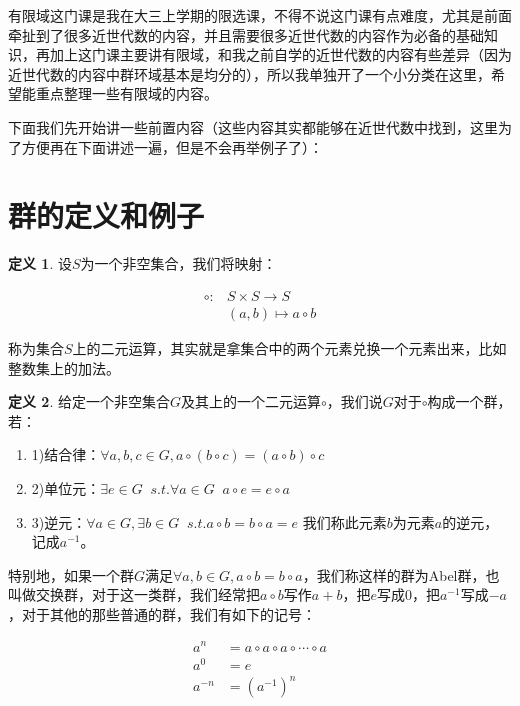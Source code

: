 \documentclass[12pt, a4paper, oneside]{ctexart}
\theoremstyle{definition}
\newtheorem*{definition}{定义}
\begin{document}
有限域这门课是我在大三上学期的限选课，不得不说这门课有点难度，尤其是前面牵扯到了很多近世代数的内容，并且需要很多近世代数的内容作为必备的基础知识，再加上这门课主要讲有限域，和我之前自学的近世代数的内容有些差异（因为近世代数的内容中群环域基本是均分的），所以我单独开了一个小分类在这里，希望能重点整理一些有限域的内容。

下面我们先开始讲一些前置内容（这些内容其实都能够在近世代数中找到，这里为了方便再在下面讲述一遍，但是不会再举例子了）：

\section*{群的定义和例子}

\begin{definition}
设$S$为一个非空集合，我们将映射：

\begin{align*}
\circ :& S\times S\rightarrow S\\
&(a,b)\mapsto a\circ b
\end{align*}

称为集合$S$上的二元运算，其实就是拿集合中的两个元素兑换一个元素出来，比如整数集上的加法。
\end{definition}

\begin{definition}
给定一个非空集合$G$及其上的一个二元运算$\circ$，我们说$G$对于$\circ$构成一个群，若：
\begin{enumerate}
\item 1)结合律：$\forall a,b,c\in G,a\circ(b\circ c)=(a\circ b)\circ c$
\item 2)单位元：$\exists e\in G \;\; s.t.\forall a\in G \;\; a\circ e=e\circ a$
\item 3)逆元：$\forall a\in G,\exists b\in G \;\; s.t. a\circ b=b\circ a=e$ 我们称此元素$b$为元素$a$的逆元，记成$a^{-1}$。
\end{enumerate}
\end{definition}

特别地，如果一个群$G$满足$\forall a,b\in G,a\circ b=b\circ a$，我们称这样的群为Abel群，也叫做交换群，对于这一类群，我们经常把$a\circ b$写作$a+b$，把$e$写成0，把$a^{-1}$写成$-a$，对于其他的那些普通的群，我们有如下的记号：

\begin{align*}
a^n&=a\circ a\circ a\circ \cdots \circ a\\
a^0&=e\\
a^{-n}&=(a^{-1})^n
\end{align*}
\end{document}
